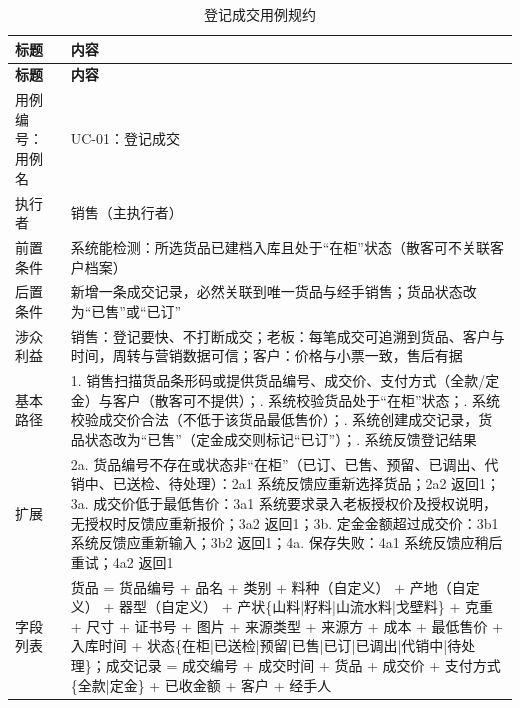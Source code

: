 \documentclass[12pt, a4paper]{ctexart}
\begin{document}
{\small
\begin{longtable}{@{}p{2.4cm} p{12.9cm}@{}}
\caption{登记成交用例规约}\label{tab:uc-01}\\
\toprule
\textbf{标题} & \textbf{内容} \\
\midrule
\endfirsthead
\toprule
\textbf{标题} & \textbf{内容} \\
\midrule
\endhead
用例编号：用例名 & UC-01：登记成交 \\
\midrule
执行者 & 销售（主执行者） \\
\midrule
前置条件 & 系统能检测：所选货品已建档入库且处于“在柜”状态（散客可不关联客户档案） \\
\midrule
后置条件 & 新增一条成交记录，必然关联到唯一货品与经手销售；货品状态改为“已售”或“已订” \\
\midrule
涉众利益 & 销售：登记要快、不打断成交；\newline 老板：每笔成交可追溯到货品、客户与时间，周转与营销数据可信；\newline 客户：价格与小票一致，售后有据 \\
\midrule
基本路径 & 1. 销售扫描货品条形码或提供货品编号、成交价、支付方式（全款/定金）与客户（散客可不提供）；\newline 2. 系统校验货品处于“在柜”状态；\newline 3. 系统校验成交价合法（不低于该货品最低售价）；\newline 4. 系统创建成交记录，货品状态改为“已售”（定金成交则标记“已订”）；\newline 5. 系统反馈登记结果 \\
\midrule
扩展 & 2a. 货品编号不存在或状态非“在柜”（已订、已售、预留、已调出、代销中、已送检、待处理）：2a1 系统反馈应重新选择货品；2a2 返回1；\newline 3a. 成交价低于最低售价：3a1 系统要求录入老板授权价及授权说明，无授权时反馈应重新报价；3a2 返回1；\newline 3b. 定金金额超过成交价：3b1 系统反馈应重新输入；3b2 返回1；\newline 4a. 保存失败：4a1 系统反馈应稍后重试；4a2 返回1 \\
\midrule
字段列表 & 货品 = 货品编号 + 品名 + 类别 + 料种（自定义） + 产地（自定义） + 器型（自定义） + 产状\{山料|籽料|山流水料|戈壁料\} + 克重 + 尺寸 + 证书号 + 图片 + 来源类型 + 来源方 + 成本 + 最低售价 + 入库时间 + 状态\{在柜|已送检|预留|已售|已订|已调出|代销中|待处理\}；\newline 成交记录 = 成交编号 + 成交时间 + 货品 + 成交价 + 支付方式\{全款|定金\} + 已收金额 + 客户 + 经手人 \\

\end{longtable}}
\end{document}
